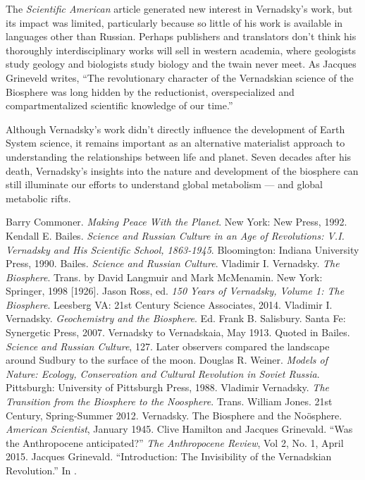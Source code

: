 \documentclass[11pt,a4paper]{article}
\begin{document}
The \emph{Scientific American} article generated new interest in Vernadsky’s
work, but its impact was limited, particularly because so little of his work
is available in languages other than Russian. Perhaps publishers and
translators don’t think his thoroughly interdisciplinary works will sell in
western academia, where geologists study geology and biologists study biology
and the twain never meet. As Jacques Grineveld writes, “The revolutionary
character of the Vernadskian science of the Biosphere was long hidden by the
reductionist, overspecialized and compartmentalized scientific knowledge of
our time.” \cite{26}

Although Vernadsky’s work didn’t directly influence the development of Earth
System science, it remains important as an alternative materialist approach to
understanding the relationships between life and planet. Seven decades after
his death, Vernadsky’s insights into the nature and development of the
biosphere can still illuminate our efforts to understand global metabolism —
and global metabolic rifts.

\begin{thebibliography}{xxx}
 Barry Commoner. {\em Making Peace With the Planet}. New York: New
  Press, 1992.
 Kendall E. Bailes. {\em Science and Russian Culture in an Age of
  Revolutions: V.I. Vernadsky and His Scientific School, 1863-1945}.
  Bloomington: Indiana University Press, 1990.
 Bailes. {\em Science and Russian Culture}. 
 Vladimir I. Vernadsky. {\em The Biosphere}. Trans. by David
  Langmuir and Mark McMenamin. New York: Springer, 1998 [1926].
 Jason Ross, ed. {\em 150 Years of Vernadsky, Volume 1: The
  Biosphere}. Leesberg VA: 21st Century Science Associates, 2014.
 Vladimir I. Vernadsky. {\em Geochemistry and the Biosphere}.
  Ed. Frank B. Salisbury. Santa Fe: Synergetic Press, 2007.
 Vernadsky to Vernadskaia, May 1913. Quoted in Bailes. {\em
  Science and Russian Culture}, 127. Later observers compared the landscape
  around Sudbury to the surface of the moon.
 Douglas R. Weiner. {\em Models of Nature: Ecology, Conservation
  and Cultural Revolution in Soviet Russia}. Pittsburgh: University of
  Pittsburgh Press, 1988.
 Vladimir Vernadsky. {\em The Transition from the Biosphere to the
  Noosphere}. Trans. William Jones. 21st Century, Spring-Summer 2012.
 Vernadsky. The Biosphere and the Noösphere. {\em American
  Scientist}, January 1945.
 Clive Hamilton and Jacques Grinevald. “Was the Anthropocene
  anticipated?” {\em The Anthropocene Review}, Vol 2, No. 1, April 2015.
 Jacques Grinevald. “Introduction: The Invisibility of the
  Vernadskian Revolution.” In \cite[p. 27]{6}.
\end{thebibliography}
	
\end{document}
